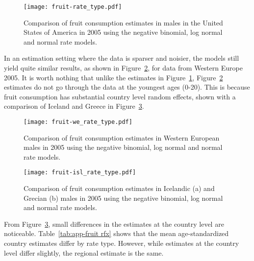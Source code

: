     \begin{figure}[h]
        \begin{center}
            \texttt{[image: fruit-rate\_type.pdf]}
            \caption{Comparison of fruit consumption estimates in
              males in the United States of America in 2005 using the
              negative binomial, log normal and normal rate models.}
            \label{fig:app-fruit rate type}
        \end{center}
    \end{figure}

In an estimation setting where the data is sparser and noisier, the
models still yield quite similar results, as shown in Figure~\ref{fig:app-fruit europe},
for data from Western Europe 2005.  It is worth nothing that unlike 
the estimates in Figure~\ref{fig:app-fruit rate type},
Figure~\ref{fig:app-fruit europe} estimates do not go through the 
data at the youngest ages (0-20).  This is because fruit consumption has 
substantial country level random effects, shown with a comparison of 
Iceland and Greece in Figure~\ref{fig:app-fruit countries}.

    \begin{figure}[h]
        \begin{center}
            \texttt{[image: fruit-we\_rate\_type.pdf]}
            \caption{Comparison of fruit consumption estimates in
              Western European males in 2005 using the
              negative binomial, log normal and normal rate models.}
            \label{fig:app-fruit europe}
        \end{center}
    \end{figure}

    \begin{figure}[h]
        \begin{center}
            \texttt{[image: fruit-isl\_rate\_type.pdf]}
            \caption{Comparison of fruit consumption estimates in
              Icelandic (a) and Grecian (b) males in 2005 using the
              negative binomial, log normal and normal rate models.}
            \label{fig:app-fruit countries}
        \end{center}
    \end{figure}

From Figure~\ref{fig:app-fruit countries},
small differences in the estimates at the country level are noticeable.
Table~\ref{tab:app-fruit rfx} shows that the mean age-standardized 
country estimates differ by rate type.  However, while estimates at
the country level differ slightly, the regional estimate is the same.


